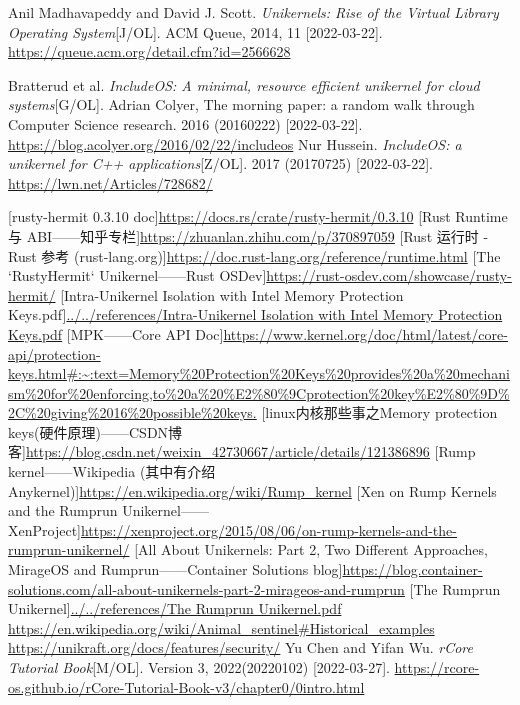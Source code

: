 \documentclass[UTF8,fontset=none,linespread=1.15]{ctexart}
\begin{document}
\begin{thebibliography}{99}
 Anil Madhavapeddy and David J. Scott. \textit{Unikernels: Rise of the Virtual Library Operating System}[J/OL]. ACM Queue, 2014, 11 [2022-03-22].  \url{https://queue.acm.org/detail.cfm?id=2566628}

  Bratterud et al. \textit{IncludeOS: A minimal, resource efficient unikernel for cloud systems}[G/OL]. Adrian Colyer, The morning paper: a random walk through Computer Science research. 2016 (20160222) [2022-03-22]. \url{https://blog.acolyer.org/2016/02/22/includeos}
 Nur Hussein. \textit{IncludeOS: a unikernel for C++ applications}[Z/OL]. 2017 (20170725) [2022-03-22]. \url{https://lwn.net/Articles/728682/}

 [rusty-hermit 0.3.10 doc]\url{https://docs.rs/crate/rusty-hermit/0.3.10}
 [Rust Runtime 与 ABI——知乎专栏]\url{https://zhuanlan.zhihu.com/p/370897059}
 [Rust 运行时 - Rust 参考 (rust-lang.org)]\url{https://doc.rust-lang.org/reference/runtime.html}
 [The `RustyHermit` Unikernel——Rust OSDev]\url{https://rust-osdev.com/showcase/rusty-hermit/}
 [Intra-Unikernel Isolation with Intel Memory Protection Keys.pdf]\url{../../references/Intra-Unikernel Isolation with Intel Memory Protection Keys.pdf}
 [MPK——Core API Doc]\url{https://www.kernel.org/doc/html/latest/core-api/protection-keys.html#:~:text=Memory%20Protection%20Keys%20provides%20a%20mechanism%20for%20enforcing,to%20a%20%E2%80%9Cprotection%20key%E2%80%9D%2C%20giving%2016%20possible%20keys.}
 [linux内核那些事之Memory protection keys(硬件原理)——CSDN博客]\url{https://blog.csdn.net/weixin_42730667/article/details/121386896}
 [Rump kernel——Wikipedia (其中有介绍 Anykernel)]\url{https://en.wikipedia.org/wiki/Rump_kernel}
 [Xen on Rump Kernels and the Rumprun Unikernel——XenProject]\url{https://xenproject.org/2015/08/06/on-rump-kernels-and-the-rumprun-unikernel/}
 [All About Unikernels: Part 2, Two Different Approaches, MirageOS and Rumprun——Container Solutions blog]\url{https://blog.container-solutions.com/all-about-unikernels-part-2-mirageos-and-rumprun}
 [The Rumprun Unikernel]\url{../../references/The Rumprun Unikernel.pdf}
 \url{https://en.wikipedia.org/wiki/Animal_sentinel#Historical_examples}
 \url{https://unikraft.org/docs/features/security/}
 Yu Chen and Yifan Wu. \textit{rCore Tutorial Book}[M/OL]. Version 3,
2022(20220102) [2022-03-27]. \url{https://rcore-os.github.io/rCore-Tutorial-Book-v3/chapter0/0intro.html}
\end{thebibliography}
\end{document}
